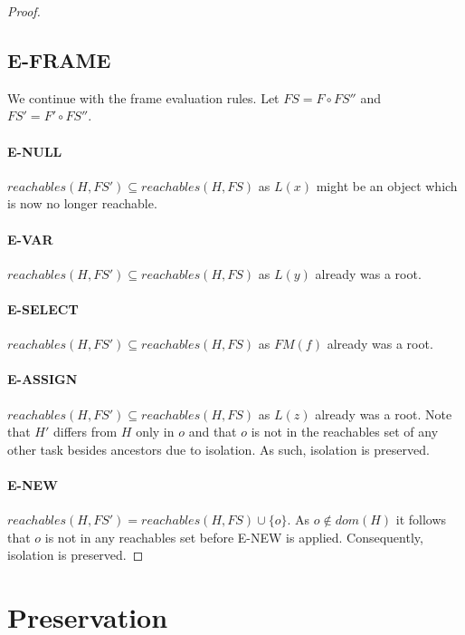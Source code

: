 \begin{proof}
\subsection{E-FRAME}
We continue with the frame evaluation rules. Let $FS = F \circ FS''$ and $FS' = F' \circ FS''$.

\paragraph{E-NULL}
$reachables(H, FS') \subseteq reachables(H, FS)$ as $L(x)$ might be an object which is now no longer reachable.

\paragraph{E-VAR}
$reachables(H, FS') \subseteq reachables(H, FS)$ as $L(y)$ already was a root.

\paragraph{E-SELECT}
$reachables(H, FS') \subseteq reachables(H, FS)$ as $FM(f)$ already was a root.

\paragraph{E-ASSIGN}
$reachables(H, FS') \subseteq reachables(H, FS)$ as $L(z)$ already was a root. Note that $H'$ differs from $H$ only in $o$ and that $o$ is not in the reachables set of any other task besides ancestors due to isolation. As such, isolation is preserved.

\paragraph{E-NEW}
$reachables(H, FS') = reachables(H, FS) \cup \{o\}$. As $o \not \in dom(H)$ it follows that $o$ is not in any reachables set before E-NEW is applied. Consequently, isolation is preserved.

\end{proof} %

\section{Preservation}
